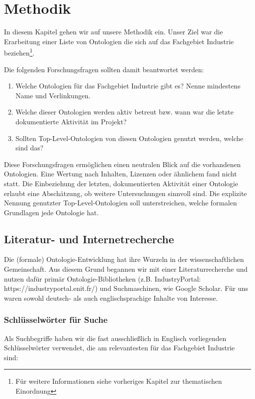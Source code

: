 \documentclass{article}
\begin{document}
\section{Methodik}

In diesem Kapitel gehen wir auf unsere Methodik ein.
Unser Ziel war die Erarbeitung einer Liste von Ontologien die sich auf das Fachgebiet Industrie beziehen\footnote{Für weitere Informationen siehe vorheriges Kapitel zur thematischen Einordnung}.

Die folgenden Forschungsfragen sollten damit beantwortet werden:

\begin{enumerate}
    \item Welche Ontologien für das Fachgebiet Industrie gibt es? Nenne mindestens Name und Verlinkungen.
    \item Welche dieser Ontologien werden aktiv betreut bzw. wann war die letzte dokumentierte Aktivität im Projekt?
    \item Sollten Top-Level-Ontologien von diesen Ontologien genutzt werden, welche sind das?
\end{enumerate}

Diese Forschungsfragen ermöglichen einen neutralen Blick auf die vorhandenen Ontologien.
Eine Wertung nach Inhalten, Lizenzen oder ähnlichem fand nicht statt.
Die Einbeziehung der letzten, dokumentierten Aktivität einer Ontologie erlaubt eine Abschätzung, ob weitere Untersuchungen sinnvoll sind.
Die explizite Nennung genutzter Top-Level-Ontologien soll unterstreichen, welche formalen Grundlagen jede Ontologie hat.

\subsection{Literatur- und Internetrecherche}

Die (formale) Ontologie-Entwicklung hat ihre Wurzeln in der wissenschaftlichen Gemeinschaft.
Aus diesem Grund begannen wir mit einer Literaturrecherche und nutzen dafür primär Ontologie-Bibliotheken (z.B. IndustryPortal: https://industryportal.enit.fr/) und Suchmaschinen, wie Google Scholar.
Für uns waren sowohl deutsch- als auch englischsprachige Inhalte von Interesse.

\subsubsection{Schlüsselwörter für Suche}

Als Suchbegriffe haben wir die fast ausschließlich in Englisch vorliegenden Schlüsselwörter verwendet, die am relevantesten für das Fachgebiet Industrie sind:
\end{document}
